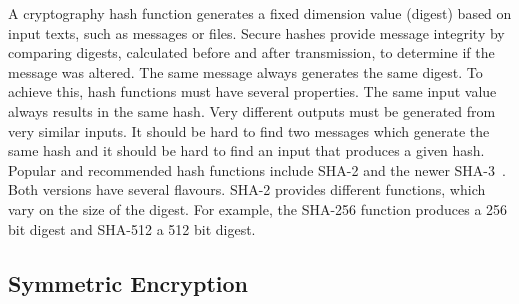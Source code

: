 A cryptography hash function generates a fixed dimension value (digest) based on input texts, such as messages or files. Secure hashes provide message integrity by comparing digests, calculated before and after transmission, to determine if the message was altered. The same message always generates the same digest.
To achieve this, hash functions must have several properties. The same input value always results in the same hash. Very different outputs must be generated from very similar inputs. It should be hard to find two messages which generate the same hash and it should be hard to find an input that produces a given hash.
Popular and recommended hash functions include \ac{SHA}-2 and the newer \ac{SHA}-3~\cite{dang2015secure}. Both versions have several flavours. \ac{SHA}-2 provides different functions, which vary on the size of the digest. For example, the \ac{SHA}-256 function produces a 256 bit digest and \ac{SHA}-512 a 512 bit digest.

\subsection{Symmetric Encryption}\label{chap:background:crypto:symmetric}

